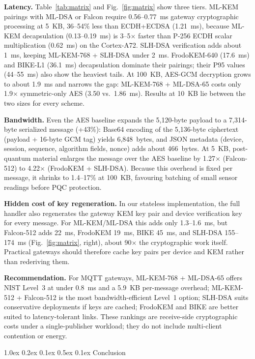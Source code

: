 \documentclass[a4paper,twocolumn,10pt]{article}
\makeatletter
\renewcommand{\section}{\@startsection{section}{1}{\z@}%
  {1.0ex \@plus 0.2ex \@minus 0.1ex}%
  {0.5ex \@plus 0.1ex}%
  {\normalfont\normalsize\bfseries}}
\makeatother
\begin{document}
\textbf{Latency.} Table~\ref{tab:matrix} and Fig.~\ref{fig:matrix} show three tiers. ML-KEM pairings with ML-DSA or Falcon require 0.56--0.77~ms gateway cryptographic processing at 5~KB, 36--54\% less than ECDH+ECDSA (1.21~ms), because ML-KEM decapsulation (0.13--0.19~ms) is 3--5$\times$ faster than P-256 ECDH scalar multiplication (0.62~ms) on the Cortex-A72. SLH-DSA verification adds about 1~ms, keeping ML-KEM-768 + SLH-DSA under 2~ms. FrodoKEM-640 (17.6~ms) and BIKE-L1 (36.1~ms) decapsulation dominate their pairings; their P95 values (44--55~ms) also show the heaviest tails. At 100~KB, AES-GCM decryption grows to about 1.9~ms and narrows the gap: ML-KEM-768 + ML-DSA-65 costs only 1.9$\times$ symmetric-only AES (3.50 vs.\ 1.86~ms). Results at 10~KB lie between the two sizes for every scheme.

\textbf{Bandwidth.} Even the AES baseline expands the 5,120-byte payload to a 7,314-byte serialized message (+43\%): Base64 encoding of the 5,136-byte ciphertext (payload + 16-byte GCM tag) yields 6,848~bytes, and JSON metadata (device, session, sequence, algorithm fields, nonce) adds about 466~bytes. At 5~KB, post-quantum material enlarges the message over the AES baseline by 1.27$\times$ (Falcon-512) to 4.22$\times$ (FrodoKEM + SLH-DSA). Because this overhead is fixed per message, it shrinks to 1.4--17\% at 100~KB, favouring batching of small sensor readings before PQC protection.

\textbf{Hidden cost of key regeneration.} In our stateless implementation, the full handler also regenerates the gateway KEM key pair and device verification key for every message. For ML-KEM/ML-DSA this adds only 1.3--1.6~ms, but Falcon-512 adds 22~ms, FrodoKEM 19~ms, BIKE 45~ms, and SLH-DSA 155--174~ms (Fig.~\ref{fig:matrix}, right), about 90$\times$ the cryptographic work itself. Practical gateways should therefore cache key pairs per device and KEM rather than rederiving them.

\textbf{Recommendation.} For MQTT gateways, ML-KEM-768 + ML-DSA-65 offers NIST Level~3 at under 0.8~ms and a 5.9~KB per-message overhead; ML-KEM-512 + Falcon-512 is the most bandwidth-efficient Level~1 option; SLH-DSA suits conservative deployments if keys are cached; FrodoKEM and BIKE are better suited to latency-tolerant links. These rankings are receive-side cryptographic costs under a single-publisher workload; they do not include multi-client contention or energy.

\section{Conclusion}
\end{document}
